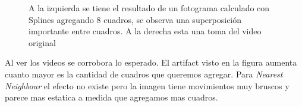 \begin{figure}[H]
\centering
\begin{minipage}{0.48\textwidth}
\end{minipage}%
\hfill
\begin{minipage}{0.48\textwidth}   

\end{minipage}
\caption{\footnotesize A la izquierda se tiene el resultado de un fotograma calculado con Splines agregando 8 cuadros, se observa una superposición importante entre cuadros. A la derecha esta una toma del video original}
\end{figure}


Al ver los videos se corrobora lo esperado. El artifact visto en la figura aumenta cuanto mayor es la cantidad de cuadros que queremos agregar. Para \textit{Nearest Neighbour} el efecto no existe pero la imagen tiene movimientos muy bruscos y parece mas estatica a medida que agregamos mas cuadros.

